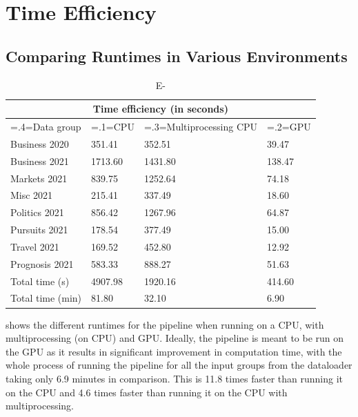 

\section{Time Efficiency}

\subsection{Comparing Runtimes in Various Environments}
\vspace{-1ex}

\begin{table}[H]
\centering
\renewcommand{\arraystretch}{1.05}
\begin{tabularx}{0.9\textwidth}{X X X X} 
\multicolumn{4}{c}{Time efficiency (in seconds)} \\
 \hline
 {\hsize=.4\hsize\linewidth=\hsize}Data group & {\hsize=.1\hsize\linewidth=\hsize}CPU & {\hsize=.3\hsize\linewidth=\hsize}Multiprocessing CPU & {\hsize=.2\hsize\linewidth=\hsize}GPU \\
 \hline
 Business 2020  & 351.41  & 352.51  & 39.47 \\ 
 Business 2021  & 1713.60 & 1431.80 & 138.47 \\
 Markets 2021   & 839.75  & 1252.64 & 74.18\\
 Misc 2021      & 215.41  & 337.49  & 18.60 \\
 Politics 2021  & 856.42  & 1267.96 & 64.87 \\
 Pursuits 2021  & 178.54  & 377.49  & 15.00 \\ 
 Travel 2021    & 169.52  & 452.80  & 12.92 \\
 Prognosis 2021 & 583.33  & 888.27  & 51.63 \\ 
 \hline
 Total time (s) & 4907.98 & 1920.16 & 414.60 \\ 
 Total time (min) & 81.80  & 32.10 & 6.90\\ 
\end{tabularx}

\caption{E-}
\label{table:cputime}
\end{table}
\vspace{-2ex}
 shows the different runtimes for the pipeline when running on a CPU, with multiprocessing (on CPU) and GPU. Ideally, the pipeline is meant to be run on the GPU as it results in significant improvement in computation time, with the whole process of running the pipeline for all the input groups from the dataloader taking only 6.9 minutes in comparison. This is 11.8 times faster than running it on the CPU and 4.6 times faster than running it on the CPU with multiprocessing. 


